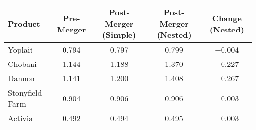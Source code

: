 \begin{tabular}{lcccc}
\hline
Product & Pre-Merger & Post-Merger (Simple) & Post-Merger (Nested) & Change (Nested) \\
\hline
Yoplait & 0.794 & 0.797 & 0.799 & +0.004 \\
Chobani & 1.144 & 1.188 & 1.370 & +0.227 \\
Dannon & 1.141 & 1.200 & 1.408 & +0.267 \\
Stonyfield Farm & 0.904 & 0.906 & 0.906 & +0.003 \\
Activia & 0.492 & 0.494 & 0.495 & +0.003 \\
\hline
\end{tabular}